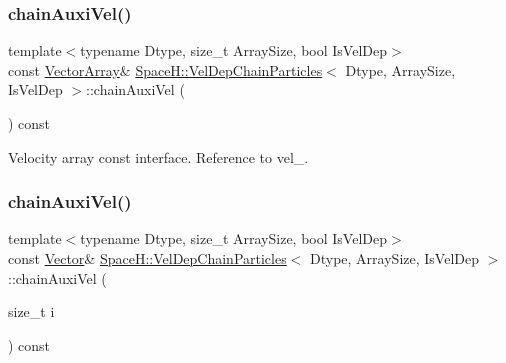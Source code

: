 \mbox{\label{class_space_h_1_1_vel_dep_chain_particles_ab2ec7493ee6cb12ed77f6aac4f4e8660}} 
\subsubsection{\texorpdfstring{chain\+Auxi\+Vel()}{chainAuxiVel()}\hspace{0.1cm}{\footnotesize\ttfamily [1/4]}}
{\footnotesize\ttfamily template$<$typename Dtype, size\+\_\+t Array\+Size, bool Is\+Vel\+Dep$>$ \\
const \mbox{\hyperlink{class_space_h_1_1_vel_indep_particles_aa9983058940249df8b00fa800e8cbad2}{Vector\+Array}}\& \mbox{\hyperlink{class_space_h_1_1_vel_dep_chain_particles}{Space\+H\+::\+Vel\+Dep\+Chain\+Particles}}$<$ Dtype, Array\+Size, Is\+Vel\+Dep $>$\+::chain\+Auxi\+Vel (\begin{DoxyParamCaption}{ }\end{DoxyParamCaption}) const\hspace{0.3cm}{\ttfamily [inline]}}



Velocity array const interface. Reference to vel\+\_\+. 

\mbox{\label{class_space_h_1_1_vel_dep_chain_particles_a1f717dd8619e3237362bacd55623500c}} 
\subsubsection{\texorpdfstring{chain\+Auxi\+Vel()}{chainAuxiVel()}\hspace{0.1cm}{\footnotesize\ttfamily [2/4]}}
{\footnotesize\ttfamily template$<$typename Dtype, size\+\_\+t Array\+Size, bool Is\+Vel\+Dep$>$ \\
const \mbox{\hyperlink{class_space_h_1_1_vel_indep_particles_a61bbcfdb0dc7f99f3c68af69a755c935}{Vector}}\& \mbox{\hyperlink{class_space_h_1_1_vel_dep_chain_particles}{Space\+H\+::\+Vel\+Dep\+Chain\+Particles}}$<$ Dtype, Array\+Size, Is\+Vel\+Dep $>$\+::chain\+Auxi\+Vel (\begin{DoxyParamCaption}\item[{size\+\_\+t}]{i }\end{DoxyParamCaption}) const\hspace{0.3cm}{\ttfamily [inline]}}



